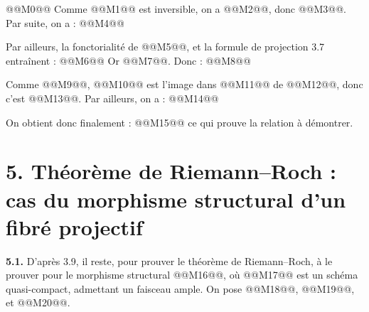 
@@M0@@
Comme @@M1@@ est inversible, on a @@M2@@, donc @@M3@@.
Par suite, on a :
@@M4@@

Par ailleurs, la fonctorialité de @@M5@@, et la formule de projection 3.7 entraînent :
@@M6@@
Or @@M7@@. Donc :
@@M8@@

Comme @@M9@@, @@M10@@ est l'image dans @@M11@@ de @@M12@@, donc c'est @@M13@@. Par ailleurs, on a :
@@M14@@

On obtient donc finalement :
@@M15@@
ce qui prouve la relation à démontrer.

\section*{5. Théorème de Riemann--Roch : cas du morphisme structural d'un fibré projectif}

\textbf{5.1.} D'après 3.9, il reste, pour prouver le théorème de Riemann--Roch, à le prouver pour le morphisme structural @@M16@@, où @@M17@@ est un schéma quasi-compact, admettant un faisceau ample. On pose @@M18@@, @@M19@@, et @@M20@@.

